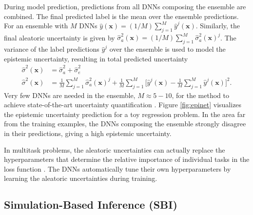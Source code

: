 During model prediction, predictions from all DNNs composing the ensemble are combined. The final predicted label is the mean over the ensemble predictions. For an ensemble with $M$ DNNs $\hat{y}(\mathbf{x}) = (1/M)\sum_{j=1}^M \hat{y}^j(\mathbf{x})$. Similarly, the final aleatoric uncertainty is given by $\hat{\sigma}^2_a(\mathbf{x}) = (1/M)\sum_{j=1}^M \hat{\sigma}_a^2(\mathbf{x})^j$.
The variance of the label predictions $\hat{y}^j$ over the ensemble is used to model the epistemic uncertainty, resulting in total predicted uncertainty
\begin{equation}
\begin{aligned}
    \hat{\sigma}^2(\mathbf{x}) &= \hat{\sigma}^2_a + \hat{\sigma}^2_e \\
    \hat{\sigma}^2(\mathbf{x}) &= \frac{1}{M}\sum_{j=1}^M \hat{\sigma}_a^2(\mathbf{x})^j + \frac{1}{M}\sum_{j=1}^M\Big[\hat{y}^j(\mathbf{x})  - \frac{1}{M}\sum_{j=1}^M \hat{y}^j(\mathbf{x})\Big]^2.
\end{aligned}
\end{equation}
Very few DNNs are needed in the ensemble, $M \approx 5 - 10$, for the method to achieve state-of-the-art uncertainty quantification \citep{lakshminarayanan_simple_2017}. Figure \ref{fig:epinet} visualizes the epistemic uncertainty prediction for a toy regression problem. In the area far from the training examples, the DNNs composing the ensemble strongly disagree in their predictions, giving a high epistemic uncertainty.

In multitask problems, the aleatoric uncertainties can actually replace the hyperparameters that determine the relative importance of individual tasks in the loss function \citep{kendall_multi-task_2018}. The DNNs automatically tune their own hyperparameters by learning the aleatoric uncertainties during training. 

\subsection{Simulation-Based Inference (SBI)}


